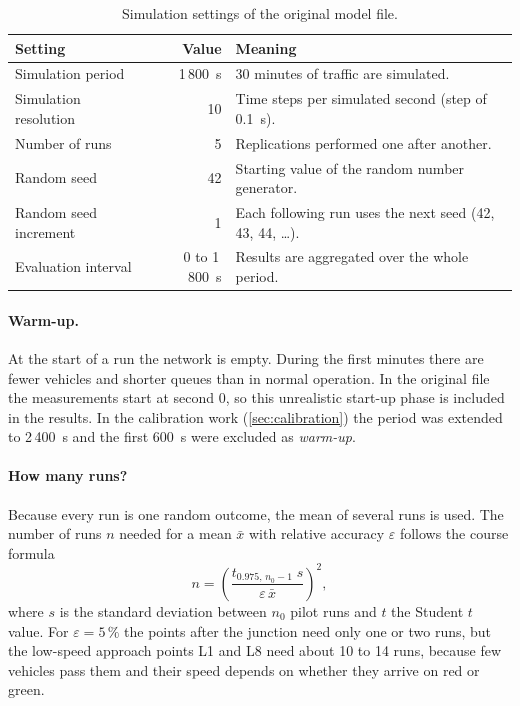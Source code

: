 \documentclass[11pt,a4paper]{article}
\begin{document}
\begin{table}[!htb]
\centering
\caption[Simulation settings]{Simulation settings of the original model file.}
\label{tab:sim}
\small
\begin{tabularx}{\textwidth}{lrX}
\toprule
\textbf{Setting} & \textbf{Value} & \textbf{Meaning}\\
\midrule
Simulation period & 1\,800~s & 30 minutes of traffic are simulated.\\
Simulation resolution & 10 & Time steps per simulated second (step of 0.1~s).\\
Number of runs & 5 & Replications performed one after another.\\
Random seed & 42 & Starting value of the random number generator.\\
Random seed increment & 1 & Each following run uses the next seed (42, 43, 44, \dots).\\
Evaluation interval & 0 to 1\,800~s & Results are aggregated over the whole period.\\
\bottomrule
\end{tabularx}
\end{table}

\paragraph{Warm-up.} At the start of a run the network is empty. During the first minutes there are
fewer vehicles and shorter queues than in normal operation. In the original file the measurements
start at second 0, so this unrealistic start-up phase is included in the results. In the
calibration work (\cref{sec:calibration}) the period was extended to 2\,400~s and the first 600~s
were excluded as \emph{warm-up}.

\paragraph{How many runs?} Because every run is one random outcome, the mean of several runs is
used. The number of runs $n$ needed for a mean $\bar x$ with relative accuracy $\varepsilon$ follows
the course formula
\begin{equation}
n = \left(\frac{t_{0.975,\,n_0-1}\; s}{\varepsilon\, \bar x}\right)^2,
\end{equation}
where $s$ is the standard deviation between $n_0$ pilot runs and $t$ the Student $t$ value. For
$\varepsilon = 5\,\%$ the points after the junction need only one or two runs, but the low-speed
approach points L1 and L8 need about 10 to 14 runs, because few vehicles pass them and their speed
depends on whether they arrive on red or green.
\end{document}
